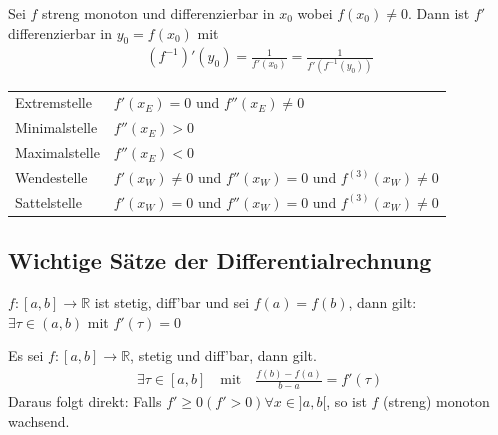\documentclass[a4paper]{article}
\begin{document}
	\begin{fsatz}
		Sei $f$ streng monoton und differenzierbar in $x_0$ wobei $f(x_0) \neq 0$. Dann ist $f'$ differenzierbar in $y_0 = f(x_0)$ mit 
		\begin{align*}
			(f^{-1})'(y_0) = \frac{1}{f'(x_0)} = \frac{1}{f'\left( f^{-1}(y_0) \right)}
		\end{align*}

	\end{fsatz}

	\begin{fmerke}[1D Kurvendiskussion]

		\renewcommand{\arraystretch}{1.6}
		\begin{tabular}{l|l}
			Extremstelle                    &   $f'(x_E) = 0$ und $f''(x_E) \ne 0$\\[-1.3mm]
			\hspace{5mm}    Minimalstelle   &   $f''(x_E) > 0$\\
			\hspace{5mm}    Maximalstelle   &   $f''(x_E) < 0$\\\hline
			Wendestelle                     &   $f'(x_W) \ne 0$ und $f''(x_W) = 0$ und $f^{(3)}(x_W) \ne 0$\\\hline
			Sattelstelle                   &   $f'(x_W) = 0$ und $f''(x_W) = 0$ und $f^{(3)}(x_W) \ne 0$\\
		\end{tabular}
	\end{fmerke}

	\subsection{Wichtige Sätze der Differentialrechnung}

		\begin{fsatz}
			$f: [a,b] \to \mathbb{R}$ ist stetig, diff'bar und sei $f(a) = f(b)$, dann gilt: \\$\exists \tau \in (a,b)$ mit $f'(\tau) = 0$
		\end{fsatz}

		\begin{fsatz}[Mittelwertsatz]
			Es sei  $f : [a,b] \to \mathbb{R}$, stetig und diff'bar, dann gilt. 
			\vspace{-3mm}
			\begin{align*}
				\exists \tau \in [a,b]\quad \text{mit} \quad \frac{f(b) - f(a)}{b - a} = f'(\tau)
			\end{align*}
			Daraus folgt direkt: Falls $f' \geq 0 (f'> 0) \forall x \in ]a,b[$, so ist $f$ (streng) monoton wachsend.
		\end{fsatz}
				\vspace{-6.7mm}
\end{document}

